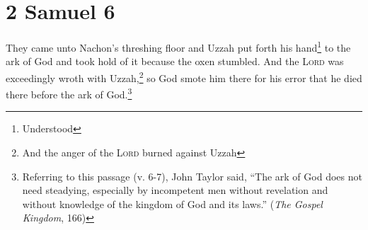 \section{2 Samuel 6}\label{2 Samuel 6}
\begin{enumerate}[align=center]
     They came unto Nachon's threshing floor and Uzzah put forth his hand\footnote{Understood} to the ark of God and took hold of it because the oxen stumbled.%
     And the \textsc{Lord} was exceedingly wroth with Uzzah,\footnote{And the anger of the \textsc{Lord} burned against Uzzah} so God smote him there for his error that he died there before the ark of God.\footnote{Referring to this passage (v. 6-7), John Taylor said, ``The ark of God does not need steadying, especially by incompetent men without revelation and without knowledge of the kingdom of God and its laws.'' (\emph{The Gospel Kingdom}, 166)}%
\end{enumerate}
